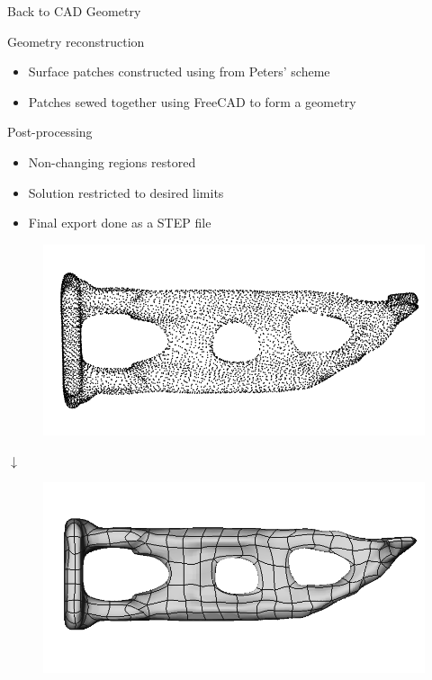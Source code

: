 \begin{frame}{Back to CAD Geometry}
	\begin{minipage}[t]{0.5\linewidth}
		\begin{block}{Geometry reconstruction}
			\begin{itemize}
				\item Surface patches constructed using from Peters' scheme \\
				\item Patches sewed together using FreeCAD to form a geometry \\
			\end{itemize}
		\end{block}
		\begin{block}{Post-processing}
			\begin{itemize}
				\item Non-changing regions restored \\
				\item Solution restricted to desired limits \\
				\item Final export done as a STEP file
			\end{itemize}
		\end{block}
	\end{minipage}
	\hfill
	\begin{minipage}[t]{0.45\linewidth}
		\vspace{-0.25cm}
		\begin{figure}
			\includegraphics[width=.88\textwidth]{Pictures/SecondHalf/Back2CAD1}
		\end{figure}
		\vspace{-0.75cm}
		\begin{center}
			$\downarrow$
		\end{center}
		\vspace{-0.6cm}
		\begin{figure}
			\includegraphics[width=.88\textwidth]{Pictures/SecondHalf/Back2CAD2}

\end{figure}
\end{minipage}
\end{frame}
